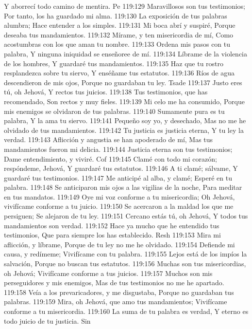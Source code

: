 Y aborrecí todo camino de mentira. 
Pe 
119:129 Maravillosos son tus testimonios; 
Por tanto, los ha guardado mi alma. 
119:130 La exposición de tus palabras alumbra; 
Hace entender a los simples. 
119:131 Mi boca abrí y suspiré, 
Porque deseaba tus mandamientos. 
119:132 Mírame, y ten misericordia de mí, 
Como acostumbras con los que aman tu nombre. 
119:133 Ordena mis pasos con tu palabra, 
Y ninguna iniquidad se enseñoree de mí. 
119:134 Líbrame de la violencia de los hombres, 
Y guardaré tus mandamientos. 
119:135 Haz que tu rostro resplandezca sobre tu siervo, 
Y enséñame tus estatutos. 
119:136 Ríos de agua descendieron de mis ojos, 
Porque no guardaban tu ley. 
Tsade 
119:137 Justo eres tú, oh Jehová, 
Y rectos tus juicios. 
119:138 Tus testimonios, que has recomendado, 
Son rectos y muy fieles. 
119:139 Mi celo me ha consumido, 
Porque mis enemigos se olvidaron de tus palabras. 
119:140 Sumamente pura es tu palabra, 
Y la ama tu siervo. 
119:141 Pequeño soy yo, y desechado, 
Mas no me he olvidado de tus mandamientos. 
119:142 Tu justicia es justicia eterna, 
Y tu ley la verdad. 
119:143 Aflicción y angustia se han apoderado de mí, 
Mas tus mandamientos fueron mi delicia. 
119:144 Justicia eterna son tus testimonios; 
Dame entendimiento, y viviré. 
Cof 
119:145 Clamé con todo mi corazón; respóndeme, Jehová, 
Y guardaré tus estatutos. 
119:146 A ti clamé; sálvame, 
Y guardaré tus testimonios. 
119:147 Me anticipé al alba, y clamé; 
Esperé en tu palabra. 
119:148 Se anticiparon mis ojos a las vigilias de la noche, 
Para meditar en tus mandatos. 
119:149 Oye mi voz conforme a tu misericordia; 
Oh Jehová, vivifícame conforme a tu juicio. 
119:150 Se acercaron a la maldad los que me persiguen; 
Se alejaron de tu ley. 
119:151 Cercano estás tú, oh Jehová, 
Y todos tus mandamientos son verdad. 
119:152 Hace ya mucho que he entendido tus testimonios, 
Que para siempre los has establecido. 
Resh 
119:153 Mira mi aflicción, y líbrame, 
Porque de tu ley no me he olvidado. 
119:154 Defiende mi causa, y redímeme; 
Vivifícame con tu palabra. 
119:155 Lejos está de los impíos la salvación, 
Porque no buscan tus estatutos. 
119:156 Muchas son tus misericordias, oh Jehová; 
Vivifícame conforme a tus juicios. 
119:157 Muchos son mis perseguidores y mis enemigos, 
Mas de tus testimonios no me he apartado. 
119:158 Veía a los prevaricadores, y me disgustaba, 
Porque no guardaban tus palabras. 
119:159 Mira, oh Jehová, que amo tus mandamientos; 
Vivifícame conforme a tu misericordia. 
119:160 La suma de tu palabra es verdad, 
Y eterno es todo juicio de tu justicia. 
Sin 
